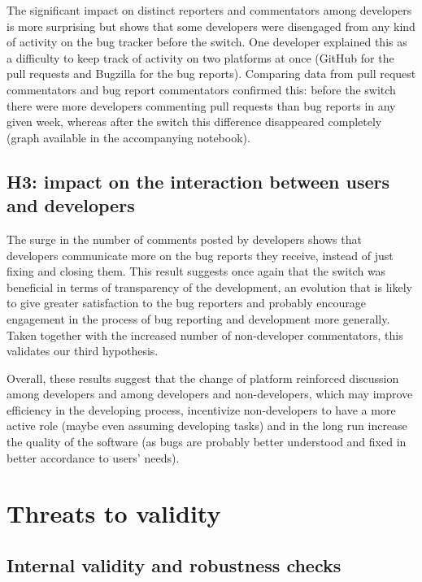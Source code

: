 \documentclass[conference]{IEEEtran}
\begin{document}
The significant impact on distinct reporters and commentators among developers is more surprising but shows that some developers were disengaged from any kind of activity on the bug tracker before the switch. One developer explained this as a difficulty to keep track of activity on two platforms at once (GitHub for the pull requests and Bugzilla for the bug reports). Comparing data from pull request commentators and bug report commentators confirmed this: before the switch there were more developers commenting pull requests than bug reports in any given week, whereas after the switch this difference disappeared completely (graph available in the accompanying notebook).


\subsection{H3: impact on the interaction between users and developers}

The surge in the number of comments posted by developers shows that developers communicate more on the bug reports they receive, instead of just fixing and closing them. This result suggests once again that the switch was beneficial in terms of transparency of the development, an evolution that is likely to give greater satisfaction to the bug reporters and probably encourage engagement in the process of bug reporting and development more generally. Taken together with the increased number of non-developer commentators, this validates our third hypothesis.

Overall, these results suggest that the change of platform reinforced discussion among developers and among developers and non-developers, which may improve efficiency in the developing process, incentivize non-developers to have a more active role (maybe even assuming developing tasks) and in the long run increase the quality of the software (as bugs are probably better understood and fixed in better accordance to users' needs). 

\section{Threats to validity}
\label{threats}
\subsection{Internal validity and robustness checks}
\end{document}
